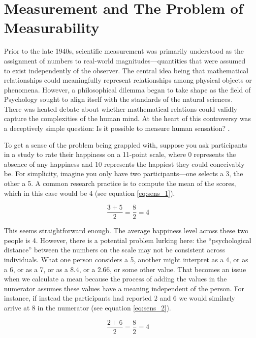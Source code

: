 \section{Measurement and The Problem of Measurability}

Prior to the late 1940s, scientific measurement was primarily understood as the assignment of numbers to real-world magnitudes—quantities that were assumed to exist independently of the observer. The central idea being that mathematical relationships could meaningfully represent relationships among physical objects or phenomena. However, a philosophical dilemma began to take shape as the field of Psychology sought to align itself with the standards of the natural sciences. There was heated debate about whether mathematical relations could validly capture the complexities of the human mind. At the heart of this controversy was a deceptively simple question: Is it possible to measure human sensation? \parencite[p. 677]{Stevens1946}.

To get a sense of the problem being grappled with, suppose you ask participants in a study to rate their happiness on a 11-point scale, where 0 represents the absence of any happiness and 10 represents the happiest they could conceivably be. For simplicity, imagine you only have two participants—one selects a 3, the other a 5. A common research practice is to compute the mean of the scores, which in this case would be 4 (see equation \ref{eq:sens_1}). 

\begin{equation}
\frac{3 + 5}{2} = \frac{8}{2} = 4
\label{eq:sens_1}
\end{equation}

\noindent
This seems straightforward enough. The average happiness level across these two people is 4. However, there is a potential problem lurking here: the ``psychological distance'' between the numbers on the scale may not be consistent across individuals. What one person considers a 5, another might interpret as a 4, or as a 6, or as a 7, or as a 8.4, or a 2.66, or some other value. That becomes an issue when we calculate a mean because the process of adding the values in the numerator assumes these values have a meaning independent of the person. For instance, if instead the participants had reported 2 and 6 we would similarly arrive at 8 in the numerator (see equation \ref{eq:sens_2}).

\begin{equation}
\frac{2 + 6}{2} = \frac{8}{2} = 4
\label{eq:sens_2}
\end{equation}

